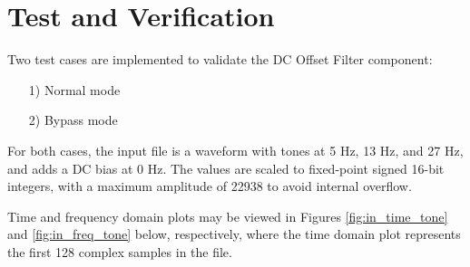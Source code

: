 \documentclass{article}
\def\Comp{DC Offset Filter}
\begin{document}
	\section*{Test and Verification}
	\normalsize
	Two test cases are implemented to validate the \Comp{} component:
	\begin{itemize}
		\item[1)] Normal mode
		\item[2)] Bypass mode
	\end{itemize}
	\noindent For both cases, the input file is a waveform with tones at 5 Hz, 13 Hz, and 27 Hz, and adds a DC bias at 0 Hz. The values are scaled to fixed-point signed 16-bit integers, with a maximum amplitude of 22938 to avoid internal overflow.\par\medskip
	\noindent Time and frequency domain plots may be viewed in Figures \ref{fig:in_time_tone} and \ref{fig:in_freq_tone} below, respectively, where the time domain plot represents the first 128 complex samples in the file.
\end{document}

